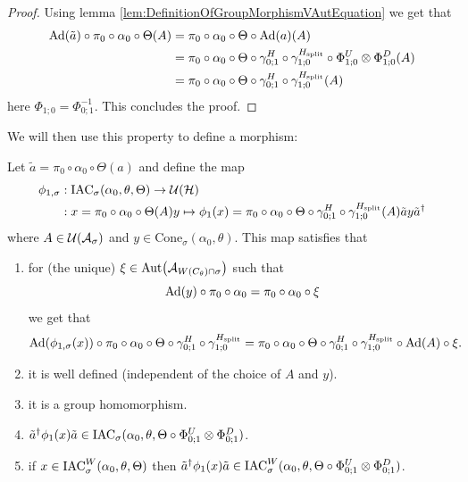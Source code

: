 \documentclass[12pt,a4paper,twoside]{article}
\numberwithin{equation}{section}
\begin{document}
\begin{proof}
	Using lemma \ref{lem:DefinitionOfGroupMorphismVAutEquation} we get that
	\begin{align}
		\Ad{\tilde{a}}\circ\pi_0\circ\alpha_0\circ\Theta(A)&=\pi_0\circ\alpha_0\circ\Theta\circ\Ad{a}(A)\\
		&=\pi_0\circ\alpha_0\circ\Theta\circ\gamma^H_{0;1}\circ\gamma^{H_\text{split}}_{1;0}\circ\Phi^U_{1;0}\otimes\Phi^D_{1;0}(A)\\
		&=\pi_0\circ\alpha_0\circ\Theta\circ\gamma^H_{0;1}\circ\gamma^{H_\text{split}}_{1;0}(A)
	\end{align}
here $\Phi_{1;0}=\Phi_{0;1}^{-1}$. This concludes the proof.
\end{proof}
We will then use this property to define a morphism:
\begin{lemma}\label{lem:DefinitionOfGroupMorphism}
	Let $\tilde{a}=\pi_0\circ\alpha_0\circ\Theta(a)$ and define the map
	\begin{align}
		\phi_{1,\sigma}&:\textrm{IAC}_\sigma(\alpha_0,\theta,\Theta) \rightarrow \mathcal U(\mathcal H)\\
		\nonumber
		&:x=\pi_0\circ\alpha_0\circ\Theta(A)y\mapsto \phi_1(x)=\pi_0\circ\alpha_0\circ\Theta\circ\gamma^H_{0;1}\circ\gamma^{H_\text{split}}_{1;0}(A)\tilde{a}y\tilde{a}^\dagger
	\end{align}
	where $A\in\mathcal U(\mathcal A_\sigma)$ and $y\in\textrm{Cone}_\sigma(\alpha_0,\theta)$. This map satisfies that
	\begin{enumerate}
		\item  for (the unique) $\xi\in\Aut{\AA_{W(C_\theta)\cap\sigma}}$ such that
		\begin{equation}
			\Ad{y}\circ\pi_0\circ\alpha_0=\pi_0\circ\alpha_0\circ\xi
		\end{equation}
		we get that
		\begin{equation}\label{eq:ConditionDefinitionOfGroupMorphism}
			\Ad{\phi_{1,\sigma}(x)}\circ\pi_0\circ\alpha_0\circ\Theta\circ\gamma^H_{0;1}\circ\gamma^{H_\text{split}}_{1;0}=\pi_0\circ\alpha_0\circ\Theta\circ\gamma^H_{0;1}\circ\gamma^{H_\text{split}}_{1;0}\circ\Ad{A}\circ\xi.
		\end{equation}
		\item it is well defined (independent of the choice of $A$ and $y$).
		\item it is a group homomorphism.
		\item $\tilde{a}^\dagger \phi_1(x)\tilde{a}\in\textrm{IAC}_\sigma(\alpha_0,\theta,\Theta\circ \Phi^U_{0;1}\otimes\Phi^D_{0;1})$.
		\item if $x\in \textrm{IAC}_\sigma^W(\alpha_0,\theta,\Theta)$ then  $\tilde{a}^\dagger \phi_1(x)\tilde{a}\in\textrm{IAC}_\sigma^W(\alpha_0,\theta,\Theta\circ \Phi^U_{0;1}\otimes\Phi^D_{0;1})$.
	\end{enumerate}
\end{lemma}
\end{document}
